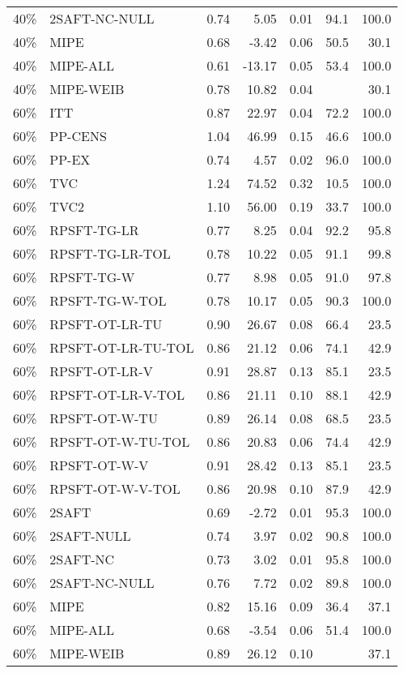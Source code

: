 \begin{table}[ht]
{\begin{tabular}{llrrrrr}
  40\% & 2SAFT-NC-NULL & 0.74 & 5.05 & 0.01 & 94.1 & 100.0 \\ 
  40\% & MIPE & 0.68 & -3.42 & 0.06 & 50.5 & 30.1 \\ 
  40\% & MIPE-ALL & 0.61 & -13.17 & 0.05 & 53.4 & 100.0 \\ 
  40\% & MIPE-WEIB & 0.78 & 10.82 & 0.04 &  & 30.1 \\ 
   \hline
60\% & ITT & 0.87 & 22.97 & 0.04 & 72.2 & 100.0 \\ 
  60\% & PP-CENS & 1.04 & 46.99 & 0.15 & 46.6 & 100.0 \\ 
  60\% & PP-EX & 0.74 & 4.57 & 0.02 & 96.0 & 100.0 \\ 
  60\% & TVC & 1.24 & 74.52 & 0.32 & 10.5 & 100.0 \\ 
  60\% & TVC2 & 1.10 & 56.00 & 0.19 & 33.7 & 100.0 \\ 
   \hline
60\% & RPSFT-TG-LR & 0.77 & 8.25 & 0.04 & 92.2 & 95.8 \\ 
  60\% & RPSFT-TG-LR-TOL & 0.78 & 10.22 & 0.05 & 91.1 & 99.8 \\ 
  60\% & RPSFT-TG-W & 0.77 & 8.98 & 0.05 & 91.0 & 97.8 \\ 
  60\% & RPSFT-TG-W-TOL & 0.78 & 10.17 & 0.05 & 90.3 & 100.0 \\ 
  60\% & RPSFT-OT-LR-TU & 0.90 & 26.67 & 0.08 & 66.4 & 23.5 \\ 
  60\% & RPSFT-OT-LR-TU-TOL & 0.86 & 21.12 & 0.06 & 74.1 & 42.9 \\ 
  60\% & RPSFT-OT-LR-V & 0.91 & 28.87 & 0.13 & 85.1 & 23.5 \\ 
  60\% & RPSFT-OT-LR-V-TOL & 0.86 & 21.11 & 0.10 & 88.1 & 42.9 \\ 
   \hline
60\% & RPSFT-OT-W-TU & 0.89 & 26.14 & 0.08 & 68.5 & 23.5 \\ 
  60\% & RPSFT-OT-W-TU-TOL & 0.86 & 20.83 & 0.06 & 74.4 & 42.9 \\ 
  60\% & RPSFT-OT-W-V & 0.91 & 28.42 & 0.13 & 85.1 & 23.5 \\ 
  60\% & RPSFT-OT-W-V-TOL & 0.86 & 20.98 & 0.10 & 87.9 & 42.9 \\ 
   \hline
60\% & 2SAFT & 0.69 & -2.72 & 0.01 & 95.3 & 100.0 \\ 
  60\% & 2SAFT-NULL & 0.74 & 3.97 & 0.02 & 90.8 & 100.0 \\ 
  60\% & 2SAFT-NC & 0.73 & 3.02 & 0.01 & 95.8 & 100.0 \\ 
  60\% & 2SAFT-NC-NULL & 0.76 & 7.72 & 0.02 & 89.8 & 100.0 \\ 
  60\% & MIPE & 0.82 & 15.16 & 0.09 & 36.4 & 37.1 \\ 
  60\% & MIPE-ALL & 0.68 & -3.54 & 0.06 & 51.4 & 100.0 \\ 
  60\% & MIPE-WEIB & 0.89 & 26.12 & 0.10 &  & 37.1 \\ 
   \hline
\end{tabular}
}
\end{table}
